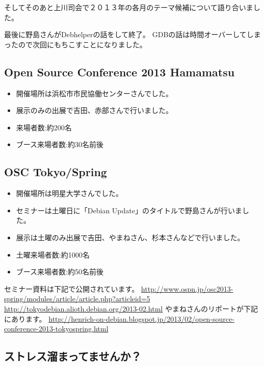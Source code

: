 \documentclass[mingoth,a4paper]{jsarticle}
\begin{document}
そしてそのあと上川司会で２０１３年の各月のテーマ候補について語り合いまし
た。

最後に野島さんがDebhelperの話をして終了。
GDBの話は時間オーバーしてしまったので次回にもちこすことになりました。

\subsection{Open Source Conference 2013 Hamamatsu}

\begin{itemize}
\item 開催場所は浜松市市民協働センターさんでした。
\item 展示のみの出展で吉田、赤部さんで行いました。
\item 来場者数:約200名
\item ブース来場者数:約30名前後
\end{itemize}

\subsection{OSC Tokyo/Spring}

\begin{itemize}
\item 開催場所は明星大学さんでした。
\item セミナーは土曜日に「Debian Update」のタイトルで野島さんが行いました。
\item 展示は土曜のみ出展で吉田、やまねさん、杉本さんなどで行いました。
\item 土曜来場者数:約1000名
\item ブース来場者数:約50名前後
\end{itemize}
セミナー資料は下記で公開されています。
\url{http://www.ospn.jp/osc2013-spring/modules/article/article.php?articleid=5}
\url{http://tokyodebian.alioth.debian.org/2013-02.html}
やまねさんのリポートが下記にあります。
\url{http://henrich-on-debian.blogspot.jp/2013/02/open-source-conference-2013-tokyospring.html}


\subsection{ストレス溜まってませんか？}
\end{document}
